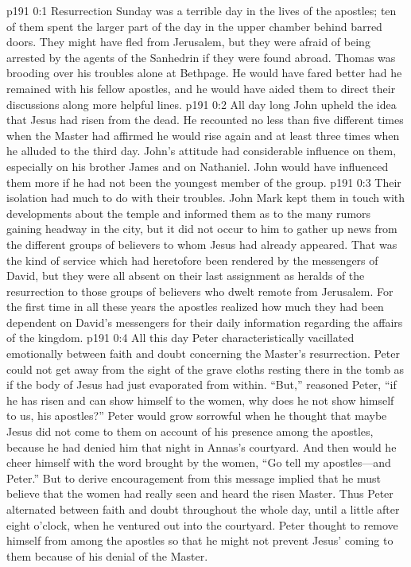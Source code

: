 \author{Midwayer Commission}
\vs p191 0:1 Resurrection Sunday was a terrible day in the lives of the apostles; ten of them spent the larger part of the day in the upper chamber behind barred doors. They might have fled from Jerusalem, but they were afraid of being arrested by the agents of the Sanhedrin if they were found abroad. Thomas was brooding over his troubles alone at Bethpage. He would have fared better had he remained with his fellow apostles, and he would have aided them to direct their discussions along more helpful lines.
\vs p191 0:2 All day long John upheld the idea that Jesus had risen from the dead. He recounted no less than five different times when the Master had affirmed he would rise again and at least three times when he alluded to the third day. John’s attitude had considerable influence on them, especially on his brother James and on Nathaniel. John would have influenced them more if he had not been the youngest member of the group.
\vs p191 0:3 Their isolation had much to do with their troubles. John Mark kept them in touch with developments about the temple and informed them as to the many rumors gaining headway in the city, but it did not occur to him to gather up news from the different groups of believers to whom Jesus had already appeared. That was the kind of service which had heretofore been rendered by the messengers of David, but they were all absent on their last assignment as heralds of the resurrection to those groups of believers who dwelt remote from Jerusalem. For the first time in all these years the apostles realized how much they had been dependent on David’s messengers for their daily information regarding the affairs of the kingdom.
\vs p191 0:4 All this day Peter characteristically vacillated emotionally between faith and doubt concerning the Master’s resurrection. Peter could not get away from the sight of the grave cloths resting there in the tomb as if the body of Jesus had just evaporated from within. “But,” reasoned Peter, “if he has risen and can show himself to the women, why does he not show himself to us, his apostles?” Peter would grow sorrowful when he thought that maybe Jesus did not come to them on account of his presence among the apostles, because he had denied him that night in Annas’s courtyard. And then would he cheer himself with the word brought by the women, \textcolor{ubdarkred}{“Go tell my apostles---and Peter.”} But to derive encouragement from this message implied that he must believe that the women had really seen and heard the risen Master. Thus Peter alternated between faith and doubt throughout the whole day, until a little after eight o’clock, when he ventured out into the courtyard. Peter thought to remove himself from among the apostles so that he might not prevent Jesus’ coming to them because of his denial of the Master.
